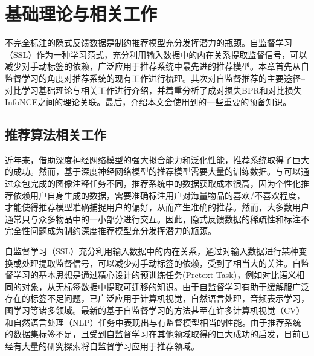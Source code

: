 
\chapter{基础理论与相关工作}
\label{cha:intro1}

不完全标注的隐式反馈数据是制约推荐模型充分发挥潜力的瓶颈。自监督学习（SSL）\cite{Liu:2021:TKDE}作为一种学习范式，充分利用输入数据中的内在关系提取监督信号，可以减少对手动标签的依赖，广泛应用于推荐系统中最先进的推荐模型。本章首先从自监督学习的角度对推荐系统的现有工作进行梳理。其次对自监督推荐的主要途径--对比学习基础理论与相关工作进行介绍，并着重分析了成对损失BPR和对比损失InfoNCE之间的理论关联。最后，介绍本文会使用到的一些重要的预备知识。

\section{推荐算法相关工作}
近年来，借助深度神经网络模型的强大拟合能力和泛化性能，推荐系统取得了巨大的成功。然而，基于深度神经网络模型的推荐模型需要大量的训练数据。与可以通过众包完成的图像注释任务不同，推荐系统中的数据获取成本很高，因为个性化推荐依赖用户自身生成的数据，需要准确标注用户对海量物品的喜欢/不喜欢程度，才能使得推荐模型准确捕捉用户的偏好，从而产生准确的推荐。然而，大多数用户通常只与众多物品中的一小部分进行交互\cite{Steffen:2009:UAI,Zhang:2013:SIGIR}。因此，隐式反馈数据的稀疏性和标注不完全性问题成为制约深度推荐模型充分发挥潜力的瓶颈\cite{Zhang:2020:ACM}。

自监督学习（SSL）\cite{Liu:2021:TKDE}充分利用输入数据中的内在关系，通过对输入数据进行某种变换或处理提取监督信号，可以减少对手动标签的依赖，受到了相当大的关注。自监督学习的基本思想是通过精心设计的预训练任务(Pretext Task)，例如对比语义相同的对象，从无标签数据中提取可迁移的知识。由于自监督学习有助于缓解服广泛存在的标签不足问题，已广泛应用于计算机视觉\cite{He:2020:CVPR,BYOL:2020:NIPS,Chen:2020:ICML}，自然语言处理\cite{Devlin:2018:bert}，音频表示学习\cite{Oord:2018:arxiv}，图学习\cite{GCC:2020:KDD,velivckovic2018deep}等诸多领域。最新的基于自监督学习的方法甚至在许多计算机视觉（CV）和自然语言处理（NLP）任务中表现出与有监督模型相当的性能\cite{Robinson:2021:ICLR,Chuang:2020:NIPS,BYOL:2020:NIPS}。由于推荐系统的数据集标签不足，且受到自监督学习在其他领域取得的巨大成功的启发，目前已经有大量的研究探索将自监督学习应用于推荐领域。

